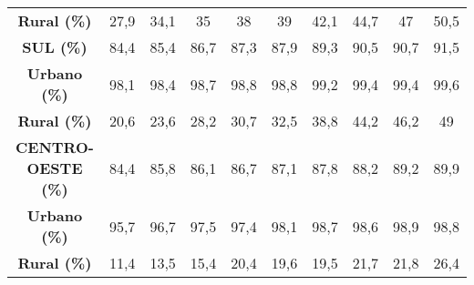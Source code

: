 \begin{table}[htbp]
\begin{tabular}{|c|c|c|c|c|c|c|c|c|c|}
    \textbf{Rural (\%)} & 27,9  & 34,1  & 35    & 38    & 39    & 42,1  & 44,7  & 47    & 50,5 \\
    \rowcolor[rgb]{ .984,  .831,  .706} \textbf{SUL (\%)} & 84,4  & 85,4  & 86,7  & 87,3  & 87,9  & 89,3  & 90,5  & 90,7  & 91,5 \\
    \textbf{Urbano (\%)} & 98,1  & 98,4  & 98,7  & 98,8  & 98,8  & 99,2  & 99,4  & 99,4  & 99,6 \\
    \rowcolor[rgb]{ .992,  .914,  .851} \textbf{Rural (\%)} & 20,6  & 23,6  & 28,2  & 30,7  & 32,5  & 38,8  & 44,2  & 46,2  & 49 \\
    \rowcolor[rgb]{ .984,  .831,  .706} \textbf{CENTRO-OESTE (\%)} & 84,4  & 85,8  & 86,1  & 86,7  & 87,1  & 87,8  & 88,2  & 89,2  & 89,9 \\
    \rowcolor[rgb]{ .992,  .914,  .851} \textbf{Urbano (\%)} & 95,7  & 96,7  & 97,5  & 97,4  & 98,1  & 98,7  & 98,6  & 98,9  & 98,8 \\
    \textbf{Rural (\%)} & 11,4  & 13,5  & 15,4  & 20,4  & 19,6  & 19,5  & 21,7  & 21,8  & 26,4 \\
\cmidrule{4-10}    
\end{tabular}%
  \label{tab:cobertura_coleta}%
\end{table}%
